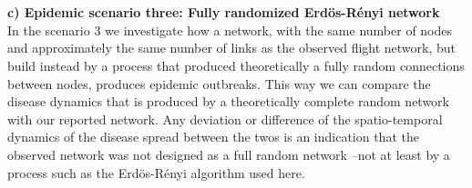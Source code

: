 \documentclass[10pt,a4paper]{article}
\begin{document}
\\\\
\textbf{c) Epidemic scenario three: Fully randomized Erd\"{o}s-R\'{e}nyi network}\\
In the scenario 3 we investigate how a network, with the same number of nodes and approximately the same number of links as the observed flight network, but build instead by a process that produced theoretically a fully random connections between nodes, produces epidemic outbreaks. 
%
This way we can compare the disease dynamics that is produced by a theoretically complete random network with our reported network. 
%
Any deviation or difference of the spatio-temporal dynamics of the disease spread between the twos is an indication that the observed network was not designed as a full random network --not at least by a process such as the Erd\"{o}s-R\'{e}nyi algorithm  used here. 
%
\end{document}
